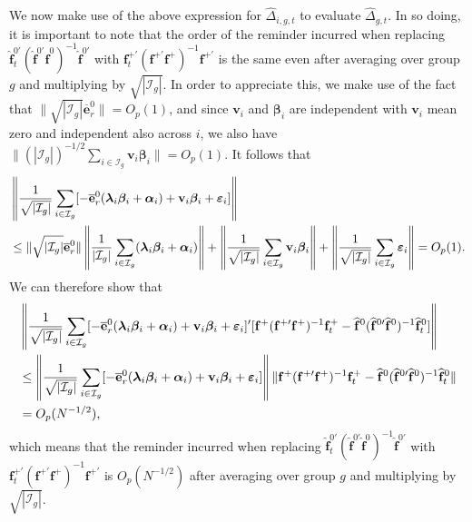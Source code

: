 \documentclass[12pt,fleqn]{article}
\def\*#1{\mathbf{#1}}
\def\+#1{\boldsymbol{#1}}
\begin{document}
We now make use of the above expression for $\widehat \Delta_{i,g,t}$ to evaluate $\widehat \Delta_{g,t}$. In so doing, it is important to note that the order of the reminder incurred when replacing $\widehat{\*f}_t^{0\prime}(\widehat{\*f}^{0\prime}\widehat{\*f}^0)^{-1}\widehat{\*f}^{0\prime}$ with $\*f_t^{+\prime}(\*f^{+\prime}\*f^+)^{-1}\*f^{+\prime}$ is the same even after averaging over group $g$ and multiplying by $\sqrt{|\mathcal{I}_g|}$. In order to appreciate this, we make use of the fact that $\|\sqrt{|\mathcal{I}_g|}\overline{\*e}_{r}^0\| = O_p(1)$, and since $\*v_{i}$ and $\+\beta_i$ are independent with $\*v_i$ mean zero and independent also across $i$, we also have $\|(|\mathcal{I}_g|)^{-1/2}\sum_{i\in \mathcal{I}_g} \*v_{i}\+\beta_i\| = O_p(1)$. It follows that
\begin{align}
& \left\|\frac{1}{\sqrt{|\mathcal{I}_g|}}\sum_{i\in \mathcal{I}_g}[ - \overline{\*e}_{r}^0(\+\lambda_i\+\beta_i +\+\alpha_i) + \*v_i\+\beta_i+  \+\varepsilon_{i} ] \right\|\notag\\
& \leq \|\sqrt{|\mathcal{I}_g|}\overline{\*e}_{r}^0\|\left\|\frac{1}{|\mathcal{I}_g|} \sum_{i \in \mathcal{I}_g} (\+\lambda_i\+\beta_i +\+\alpha_i)\right\| + \left\| \frac{1}{\sqrt{|\mathcal{I}_g|}} \sum_{i\in \mathcal{I}_g} \*v_{i}\+\beta_i \right\| +  \left\|\frac{1}{\sqrt{|\mathcal{I}_g|}} \sum_{i \in \mathcal{I}_g} \+\varepsilon_{i}\right\| =O_p(1).
\end{align}
We can therefore show that
\begin{align}
& \left\|\frac{1}{\sqrt{|\mathcal{I}_g|}}\sum_{i \in \mathcal{I}_g} [ - \overline{\*e}_{r}^0(\+\lambda_i\+\beta_i +\+\alpha_i) + \*v_i\+\beta_i+  \+\varepsilon_{i} ]'[\*f^{+} (\*f^{+\prime}\*f^+)^{-1}\*f_t^+ - \widehat{\*f}^{0} (\widehat{\*f}^{0\prime}\widehat{\*f}^0)^{-1}\widehat{\*f}_t^0] \right\| \notag\\
& \leq
\left\| \frac{1}{\sqrt{|\mathcal{I}_g|}}\sum_{i \in \mathcal{I}_g}[ - \overline{\*e}_{r}^0(\+\lambda_i\+\beta_i +\+\alpha_i) + \*v_i\+\beta_i+  \+\varepsilon_{i} ]\right\| \|\*f^{+} (\*f^{+\prime}\*f^+)^{-1}\*f_t^+ - \widehat{\*f}^{0} (\widehat{\*f}^{0\prime}\widehat{\*f}^0)^{-1}\widehat{\*f}_t^0\|\notag\\
& = O_p(N^{-1/2}),
\end{align}
which means that the reminder incurred when replacing $\widehat{\*f}_t^{0\prime}(\widehat{\*f}^{0\prime}\widehat{\*f}^0)^{-1}\widehat{\*f}^{0\prime}$ with $\*f_t^{+\prime}(\*f^{+\prime}\*f^+)^{-1}\*f^{+\prime}$ is $O_p(N^{-1/2})$ after averaging over group $g$ and multiplying by $\sqrt{|\mathcal{I}_g|}$.
\end{document}
